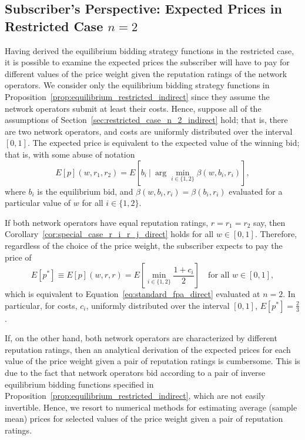 \subsection{Subscriber's Perspective: Expected Prices in Restricted Case $n=2$} %
\label{sub:subscriber_s_perspective_expected_prices_in_restricted_case_n_2_indirect}
Having derived the equilibrium bidding strategy functions in the restricted case, it is possible to examine the expected prices the subscriber will have to pay for different values of the price weight given the reputation ratings of the network operators. We consider only the equilibrium bidding strategy functions in Proposition~\ref{prop:equilibrium_restricted_indirect} since they assume the network operators submit at least their costs. Hence, suppose all of the assumptions of Section~\ref{sec:restricted_case_n_2_indirect} hold; that is, there are two network operators, and costs are uniformly distributed over the interval $[0,1]$. The expected price is equivalent to the expected value of the winning bid; that is, with some abuse of notation
\begin{equation}
  \label{eq:exp_price_def_indirect}
  E[p](w,r_1,r_2) = E[b_i \:\vert\: \arg\min_{i\in \{1,2\}}\beta(w,b_i,r_i)],
\end{equation}
where $b_i$ is the equilibrium bid, and $\beta(w,b_i,r_i) = \beta(b_i,r_i)$ evaluated for a particular value of $w$ for all $i\in \{1,2\}$.

If both network operators have equal reputation ratings, $r = r_1 = r_2$ say, then Corollary~\ref{cor:special_case_r_i_r_j_direct} holds for all $w\in [0,1]$. Therefore, regardless of the choice of the price weight, the subscriber expects to pay the price of
\begin{equation}
  \label{eq:exp_price_at_w_1_indirect}
  E[p^*] \equiv E[p](w,r,r) = E\left[\min_{i\in \{1,2\}}\frac{1+c_i}{2}\right] \quad\text{for all } w\in [0,1],
\end{equation}
which is equivalent to Equation~\eqref{eq:standard_fpa_direct} evaluated at $n=2$. In particular, for costs, $c_i$, uniformly distributed over the interval $[0,1]$, $E[p^*] = \frac{2}{3}$.

If, on the other hand, both network operators are characterized by different reputation ratings, then an analytical derivation of the expected prices for each value of the price weight given a pair of reputation ratings is cumbersome. This is due to the fact that network operators bid according to a pair of inverse equilibrium bidding functions specified in Proposition~\ref{prop:equilibrium_restricted_indirect}, which are not easily invertible. Hence, we resort to numerical methods for estimating average (sample mean) prices for selected values of the price weight given a pair of reputation ratings.

